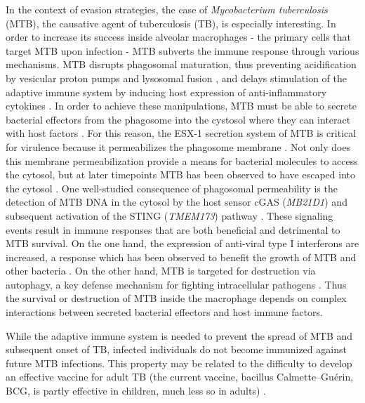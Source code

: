 In the context of evasion strategies, the case of \emph{Mycobacterium
tuberculosis} (MTB), the causative agent of tuberculosis (TB), is
especially interesting. In order to increase its success inside alveolar
macrophages - the primary cells that target MTB upon infection - MTB
subverts the immune response through various mechanisms. MTB disrupts
phagosomal maturation, thus preventing acidification by vesicular proton
pumps and lysosomal fusion \citep{Sturgill-Koszycki1994, Hornef2002,
Hestvik2005}, and delays stimulation of the adaptive immune system by
inducing host expression of anti-inflammatory cytokines
\citep{VanHeyningen1997, Giacomini2001}. In order to achieve these
manipulations, MTB must be able to secrete bacterial effectors from the
phagosome into the cystosol where they can interact with host factors
\citep{Stanley2013}. For this reason, the ESX-1 secretion system of MTB
is critical for virulence because it permeabilizes the phagosome
membrane \citep{VanderWel2007, Simeone2015}. Not only does this membrane
permeabilization provide a means for bacterial molecules to access the
cytosol, but at later timepoints MTB has been observed to have escaped
into the cytosol \citep{Stanley2013}. One well-studied consequence of
phagosomal permeability is the detection of MTB DNA in the cytosol by
the host sensor cGAS (\emph{MB21D1}) and subsequent activation of the
STING (\emph{TMEM173}) pathway \citep{Dey2015, Collins2015, Watson2015,
Wassermann2015}. These signaling events result in immune responses
that are both beneficial and detrimental to MTB survival. On the one
hand, the expression of anti-viral type I interferons are increased, a
response which has been observed to benefit the growth of MTB and other
bacteria \citep{Stanley2007}. On the other hand, MTB is targeted for
destruction via autophagy, a key defense mechanism for fighting
intracellular pathogens \citep{Watson2012}. Thus the survival or
destruction of MTB inside the macrophage depends on complex interactions
between secreted bacterial effectors and host immune factors.

While the adaptive immune system is needed to prevent the spread of MTB
and subsequent onset of TB, infected individuals do not become immunized
against future MTB infections. This property may be related to the
difficulty to develop an effective vaccine for adult TB (the current
vaccine, bacillus Calmette--Guérin, BCG, is partly effective in
children, much less so in adults) \citep{Wang2013}.

